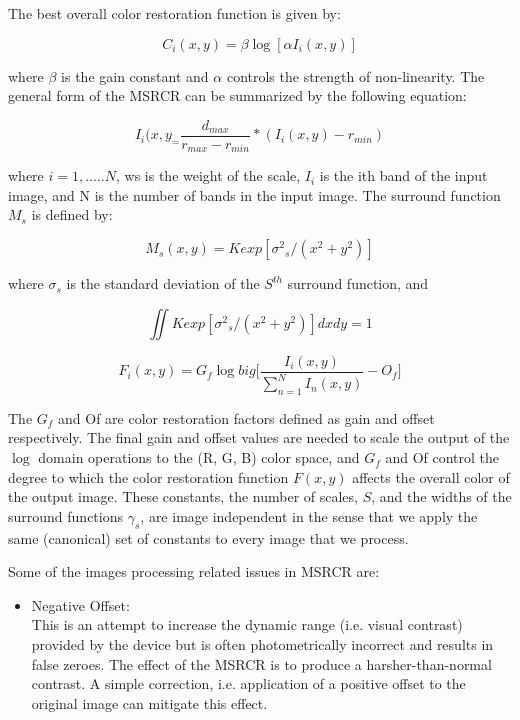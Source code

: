 The best overall color restoration function is given by:

\begin{equation}
	C_{i}(x,y)=\beta \log[\alpha I_{i}(x,y)]
\end{equation}

where $\beta$ is the gain constant and $\alpha$ controls the strength of
non-linearity.
The general form of the MSRCR can be summarized by
the following equation:

\begin{equation}
	I_{i}(x,y_=\frac{d_{max}}{r_{max}-r_{min}}*(I_{i}(x,y)-r_{min})
\end{equation}

where $i =1, ….. N$, ws is the weight of the scale, $I_{i}$ is the
ith band of the input image, and N is the number of bands
in the input image. The surround function $M_{s}$ is defined
by:

\begin{equation}
	M_{s}(x,y)=K exp[{\sigma^{2}}_{s}/(x^{2}+y^{2})]
\end{equation}

where $\sigma_{s}$ is the standard deviation of the $S^{th}$ surround
function, and

\begin{equation}
	\iint K exp[{\sigma^{2}}_{s}/(x^{2}+y^{2})]dx dy =1
\end{equation}

\begin{equation}
	F_{i}(x,y)=G_{f} \log big[\frac{I_{i}(x,y)}{\sum_{n=1}^N I_{n}(x,y)}-O_{f}\big]
\end{equation}

The $G_{f}$ and Of are color restoration factors defined as
gain and offset respectively. The final gain and offset
values are needed to scale the output of the $\log$ domain
operations to the (R, G, B) color space, and $G_{f}$ and Of
control the degree to which the color restoration function
$F(x,y)$ affects the overall color of the output image. These
constants, the number of scales, $S$, and the widths of the
surround functions $\gamma_{s}$, are image independent in the sense
that we apply the same (canonical) set of constants to
every image that we process.

Some of the images processing related issues in MSRCR
are:
\begin{itemize}
	\item Negative Offset:\\
	This is an attempt to increase the dynamic range (i.e.
visual contrast) provided by the device but is often
photometrically incorrect and results in false zeroes. The
effect of the MSRCR is to produce a harsher-than-normal
contrast. A simple correction, i.e. application of a
positive offset to the original image can mitigate this
effect.

\end{itemize}


